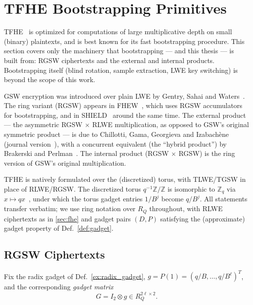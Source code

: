 \section{TFHE Bootstrapping Primitives}
\label{sec:tfhe}

TFHE~\cite{cryptoeprint:2016/870, cryptoeprint:2018/421} is optimized for computations of large multiplicative depth on small (binary) plaintexts, and is best known for its fast bootstrapping procedure. This section covers only the machinery that bootstrapping --- and this thesis --- is built from: RGSW ciphertexts and the external and internal products. Bootstrapping itself (blind rotation, sample extraction, LWE key switching) is beyond the scope of this work.

GSW encryption was introduced over plain LWE by Gentry, Sahai and Waters~\cite{cryptoeprint:2013/340}. The ring variant (RGSW) appears in FHEW~\cite{cryptoeprint:2014/816}, which uses RGSW accumulators for bootstrapping, and in SHIELD~\cite{cryptoeprint:2014/838} around the same time. The external product --- the asymmetric RGSW $\times$ RLWE multiplication, as opposed to GSW's original symmetric product --- is due to Chillotti, Gama, Georgieva and Izabach\`ene~\cite{cryptoeprint:2016/870} (journal version~\cite{cryptoeprint:2018/421}), with a concurrent equivalent (the ``hybrid product'') by Brakerski and Perlman~\cite{cryptoeprint:2016/339}. The internal product (RGSW $\times$ RGSW) is the ring version of GSW's original multiplication.

\begin{remark}
    TFHE is natively formulated over the (discretized) torus, with TLWE/TGSW in place of RLWE/RGSW. The discretized torus $q^{-1}\mathbb{Z}/\mathbb{Z}$ is isomorphic to $\mathbb{Z}_q$ via $x \mapsto qx$~\cite{cryptoeprint:2021/1402}, under which the torus gadget entries $1/B^j$ become $q/B^j$. All statements transfer verbatim; we use ring notation over $R_Q$ throughout, with RLWE ciphertexts as in \autoref{sec:fhe} and gadget pairs $(D, P)$ satisfying the (approximate) gadget property of Def.~\ref{def:gadget}.
\end{remark}

\subsection{RGSW Ciphertexts}
Fix the radix gadget of Def.~\ref{ex:radix_gadget}, $g = P(1) = (q/B, \dots, q/B^\ell)^T$, and the corresponding \textit{gadget matrix}
\begin{equation}
    G = I_2 \otimes g \in R_Q^{2\ell \times 2}.
\end{equation}

